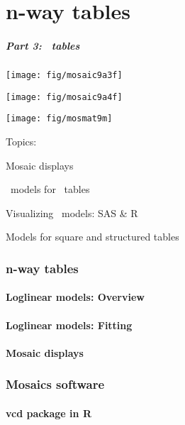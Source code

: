 \part{n-way tables}
\begin{frame}
  \frametitle{Part 3: \nway\ tables}
 \begin{minipage}[c]{.33\textwidth}
  \texttt{[image: fig/mosaic9a3f]}
  \end{minipage}%
 \hfill
 \begin{minipage}[c]{.33\textwidth}
  \texttt{[image: fig/mosaic9a4f]}
 \end{minipage}
 \hfill
 \begin{minipage}[c]{.33\textwidth}
  \texttt{[image: fig/mosmat9m]}
 \end{minipage}

Topics:
  \begin{itemize*}
	\item Mosaic displays 
	\item \loglin\ models for \nway\ tables
    \item Visualizing \loglin\ models: SAS \& R
    \item Models for square and structured tables
  \end{itemize*}
\end{frame}
\section{n-way tables}

\subsection{Loglinear models: Overview}

\subsection{Loglinear models: Fitting}

\subsection{Mosaic displays}

\section{Mosaics software}

\subsection{vcd package in R}

%

\endinput

